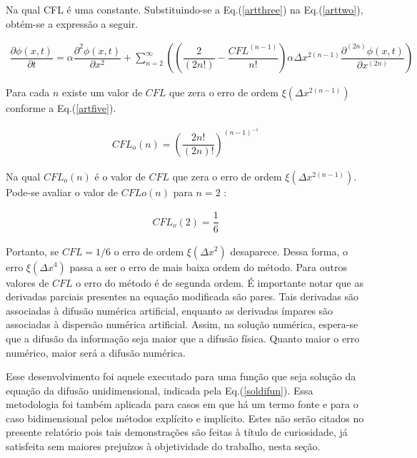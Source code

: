 	Na qual CFL é uma constante. Substituindo-se a Eq.(\ref{artthree}) na Eq.(\ref{arttwo}), obtém-se a expressão a seguir.
	
\begin{align}
\label{artfour}
\dfrac{\partial \phi (x,t)}{\partial t} = \alpha  \dfrac{\partial^{2}\phi(x,t)}{\partial x^{2}} + \sum_{n=2}^{\infty}\left(\left(\dfrac{2}{(2n!)}-\dfrac{CFL^{(n-1)}}{n!}\right)\alpha \Delta x^{2(n-1)} \dfrac{\partial^{(2n)}\phi(x,t)}{\partial x^{(2n)}}\right)
\end{align}


	Para cada $n$ existe um valor de $CFL$ que zera o erro de ordem $ \xi(\Delta x^{2(n-1)}) $ conforme a Eq.(\ref{artfive}).
	
\begin{align}
\label{artfive}
CFL_{o}(n)=\left(\dfrac{2n!}{(2n)!}\right)^{(n-1)^{-1}}
\end{align}	


	Na qual $CFL_o(n)$ é o valor de $CFL$ que zera o erro de ordem $ \xi(\Delta x^{2(n-1)}) $. Pode-se avaliar o valor de $CFLo(n)$ para $n=2$ :
	
\begin{align}
\label{artfive}
CFL_{o}(2)= \dfrac{1}{6}
\end{align}


	Portanto, se $CFL=1/6$ o erro de ordem $\xi(\Delta x^2)$ desaparece. Dessa forma, o erro $\xi(\Delta x^4)$ passa a ser o erro de mais baixa ordem do método. Para outros valores de $CFL$ o erro do método é de segunda ordem. É importante notar que as derivadas parciais presentes na equação modificada são pares. Tais derivadas são associadas à difusão numérica artificial, enquanto as derivadas ímpares são associadas à dispersão numérica artificial. Assim, na solução numérica, espera-se que a difusão da informação seja maior que a difusão física. Quanto maior o erro numérico, maior será a difusão numérica.
	
	Esse desenvolvimento foi aquele executado para uma função que seja solução da equação da difusão unidimensional, indicada pela Eq.(\ref{soldifun}). Essa metodologia foi também aplicada para casos em que há um termo fonte e para o caso bidimensional pelos métodos explícito e implícito. Estes não serão citados no presente relatório pois tais demonstrações são feitas à título de curiosidade, já satisfeita sem maiores prejuízos à objetividade do trabalho, nesta seção. 